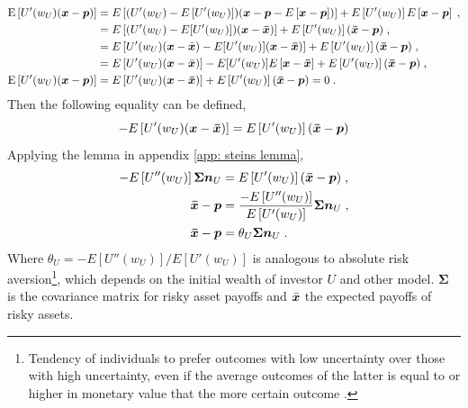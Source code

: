 \begin{equation*}
	\begin{split}
		\mathrm{E}\left[U'(w_{U})(\bm{x}-\bm{p})\right] &= E\left[(U'(w_U)-E\left[U'(w_U)\right])(\bm{x}-\bm{p}-E\left[\bm{x}-\bm{p}\right])\right] + E\left[U'(w_U)\right]E\left[\bm{x}-\bm{p}\right]\;,\\
		&= E\left[(U'(w_U)-E[U'(w_U)])(\bm{x}-\bm{\Bar{x}})\right]+ E\left[U'(w_U)\right](\bm{\Bar{x}}-\bm{p})\;,\\
		&= E\left[U'(w_U)(\bm{x}-\Bar{\bm{x}})-E[U'(w_U)](\bm{x}-\bm{\Bar{x}})\right]+ E\left[U'(w_U)\right](\bm{\Bar{x}}-\bm{p})\;,\\
		&= E\left[U'(w_U)(\bm{x}-\Bar{\bm{x}})\right]-E[U'(w_U)]E\left[\bm{x}-\bm{\Bar{x}}\right]+ E\left[U'(w_U)\right](\bm{\Bar{x}}-\bm{p})\;,\\
		\mathrm{E}\left[U'(w_{U})(\bm{x}-\bm{p})\right] &= E\left[U'(w_U)(\bm{x}-\bm{\Bar{x}})\right]+ E\left[U'(w_U)\right](\bm{\Bar{x}}-\bm{p})=0\;.
	\end{split}
\end{equation*}
Then the following equality can be defined,
\begin{equation*}
	-E\left[U'(w_U)(\bm{x}-\bm{\Bar{x}})\right]= E\left[U'(w_U)\right](\bm{\Bar{x}}-\bm{p})
\end{equation*}
Applying the lemma in appendix \ref{app: steins lemma},
\begin{equation}
	\begin{split}
		-E\left[U''(w_U)\right]\bm{\Sigma}\bm{n}_{U}&=E\left[U'(w_U)\right](\bm{\Bar{x}}-\bm{p})\;,\\
		\bm{\Bar{\bm{x}}}-\bm{p} &= \frac{-E\left[U''(w_U)\right]}{E\left[U'(w_U)\right]}\bm{\Sigma}\bm{n}_U\;,\\
		\bm{\Bar{\bm{x}}}-\bm{p} &= \theta_U\bm{\Sigma}\bm{n}_U\;.
	\end{split}
	\label{eq:unrestricted}
\end{equation}
Where $\theta_{U}={-E\left[U''(w_U)\right]}/{E\left[U'(w_U)\right]}$ is analogous to absolute risk aversion\footnote{Tendency of individuals to prefer outcomes with low uncertainty over those with high uncertainty, even if the average outcomes of the latter is equal to or higher in monetary value that the more certain outcome \parencite{pratt1964risk}.}, which depends on the initial wealth of investor $U$ and other model. $\bm{\Sigma}$ is the covariance matrix for risky asset payoffs and $\Bar{\bm{x}}$ the expected payoffs of risky assets.

